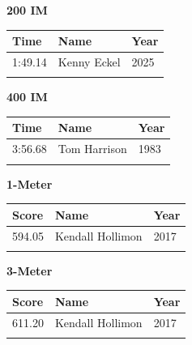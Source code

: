 \hfill
\begin{minipage}[t]{0.48\textwidth}
\centering
\textbf{\textcolor{teamprimary}{200 IM}}\par
\vspace{0.5em}
\centering
\small
\renewcommand{\arraystretch}{1.0}
\setlength{\tabcolsep}{4pt}
\begin{tabular}{@{}p{1.8cm}p{3.0cm}p{1.0cm}@{}}
\toprule
\textbf{Time} & \textbf{Name} & \textbf{Year} \\
\midrule
1:49.14 & Kenny Eckel & 2025 \\
\bottomrule
\vspace{0.5em}
\end{tabular}
\end{minipage}
\vspace{1.2em}
\noindent\begin{minipage}[t]{0.48\textwidth}
\centering
\textbf{\textcolor{teamprimary}{400 IM}}\par
\vspace{0.5em}
\centering
\small
\renewcommand{\arraystretch}{1.0}
\setlength{\tabcolsep}{4pt}
\begin{tabular}{@{}p{1.8cm}p{3.0cm}p{1.0cm}@{}}
\toprule
\textbf{Time} & \textbf{Name} & \textbf{Year} \\
\midrule
3:56.68 & Tom Harrison & 1983 \\
\bottomrule
\vspace{0.5em}
\end{tabular}
\end{minipage}
\hfill
\begin{minipage}[t]{0.48\textwidth}
\centering
\textbf{\textcolor{teamprimary}{1-Meter}}\par
\vspace{0.5em}
\centering
\small
\renewcommand{\arraystretch}{1.0}
\setlength{\tabcolsep}{4pt}
\begin{tabular}{@{}p{1.8cm}p{3.0cm}p{1.0cm}@{}}
\toprule
\textbf{Score} & \textbf{Name} & \textbf{Year} \\
\midrule
594.05 & Kendall Hollimon & 2017 \\
\bottomrule
\vspace{0.5em}
\end{tabular}
\end{minipage}
\vspace{1.2em}
\noindent\begin{minipage}[t]{0.98\textwidth}
\centering
\textbf{\textcolor{teamprimary}{3-Meter}}\par
\vspace{0.5em}
\centering
\small
\renewcommand{\arraystretch}{1.0}
\setlength{\tabcolsep}{4pt}
\begin{tabular}{@{}p{1.8cm}p{3.0cm}p{1.0cm}@{}}
\toprule
\textbf{Score} & \textbf{Name} & \textbf{Year} \\
\midrule
611.20 & Kendall Hollimon & 2017 \\
\bottomrule
\vspace{0.5em}
\end{tabular}
\end{minipage}